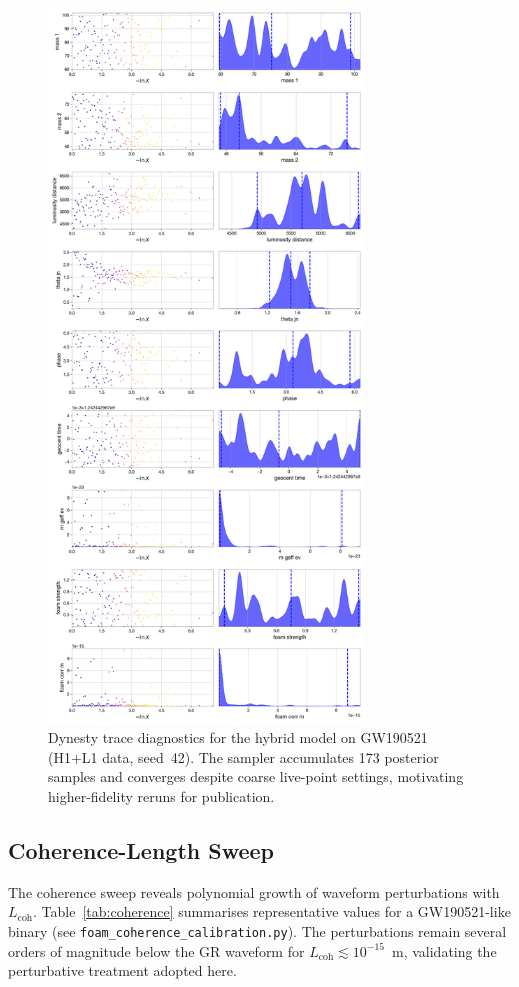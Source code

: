 \documentclass[prd,onecolumn,longbibliography,nofootinbib]{revtex4-2}
\begin{document}
\begin{figure}[t]
    \centering
    \includegraphics[width=0.75\textwidth]{results/GW190521/hybrid/seed_042/hybrid_seed042_checkpoint_trace.png}
    \caption{Dynesty trace diagnostics for the hybrid model on GW190521 (H1+L1 data, seed~42). The sampler accumulates 173 posterior samples and converges despite coarse live-point settings, motivating higher-fidelity reruns for publication.}
    \label{fig:trace}
\end{figure}

\subsection{Coherence-Length Sweep}
The coherence sweep reveals polynomial growth of waveform perturbations with $L_{\mathrm{coh}}$. Table~\ref{tab:coherence} summarises representative values for a GW190521-like binary (see \texttt{foam\_coherence\_calibration.py}). The perturbations remain several orders of magnitude below the GR waveform for $L_{\mathrm{coh}} \lesssim 10^{-15}$~m, validating the perturbative treatment adopted here.
\end{document}
